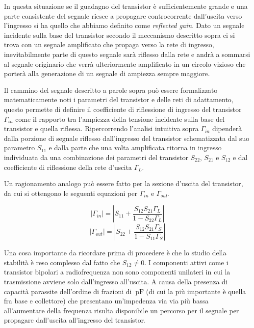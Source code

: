 \documentclass[12pt,oneside]{book}
\begin{document}
In questa situazione se il guadagno del transistor è sufficientemente grande e una parte consistente del segnale riesce a propagare controcorrente dall'uscita verso l'ingresso si ha quello che abbiamo definito come \textit{reflected gain}. Dato un segnale incidente sulla base del transistor secondo il meccanismo descritto sopra ci si trova con un segnale amplificato che propaga verso la rete di ingresso, inevitabilmente parte di questo segnale sarà riflesso dalla rete e andrà a sommarsi al segnale originario che verrà ulteriormente amplificato in un circolo vizioso che porterà alla generazione di un segnale di ampiezza sempre maggiore.

Il cammino del segnale descritto a parole sopra può essere formalizzato matematicamente noti i parametri del transistor e delle reti di adattamento, questo permette di definire il coefficiente di riflessione di ingresso del transistor $\Gamma_{in}$ come il rapporto tra l'ampiezza della tensione incidente sulla base del transistor e quella riflessa. Ripercorrendo l'analisi intuitiva sopra $\Gamma_{in}$ dipenderà dalla porzione di segnale riflesso dall'ingresso del transistor schematizzata dal suo parametro $S_{11}$ e dalla parte che una volta amplificata ritorna in ingresso individuata da una combinazione dei parametri del transistor $S_{22}$, $S_{21}$ e $S_{12}$ e dal coefficiente di riflessione della rete d'uscita $\Gamma_{L}$.

Un ragionamento analogo può essere fatto per la sezione d'uscita del transistor, da cui si ottengono le seguenti equazioni per $\Gamma_{in}$ e $\Gamma_{out}$.

\begin{equation}
    \left|\Gamma_{in}\right| = \left|S_{11} + \dfrac{S_{12}S_{21}\Gamma_{L}}{1-S_{22}\Gamma_{L}}\right|
    \label{gamma_in}
\end{equation}
\begin{equation}
    \left|\Gamma_{out}\right| = \left|S_{22} + \dfrac{S_{12}S_{21}\Gamma_{S}}{1-S_{11}\Gamma_{S}}\right|
    \label{gamma_out}
\end{equation}

Una cosa importante da ricordare prima di procedere è che lo studio della stabilità è reso complesso dal fatto che $S_{12} \neq 0$. I componenti attivi come i transistor bipolari a radiofrequenza non sono componenti unilateri in cui la trasmissione avviene solo dall'ingresso all'uscita. A causa della presenza di capacità parassite dell'ordine di frazioni di $\SI{}{\pico\farad}$ (di cui la più importante è quella fra base e collettore) che presentano un'impedenza via via più bassa all'aumentare della frequenza risulta disponibile un percorso per il segnale per propagare dall'uscita all'ingresso del transistor.
\end{document}
